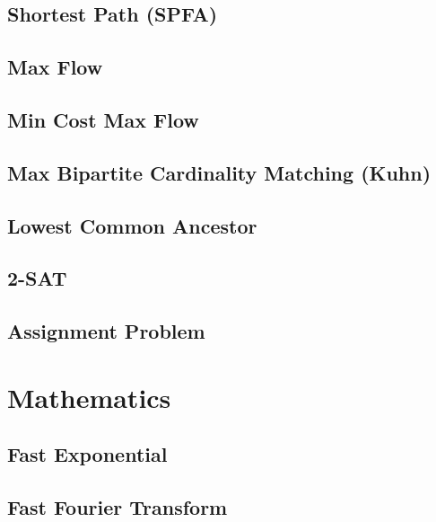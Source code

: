 \subsection{Shortest Path (SPFA)}
\raggedbottom
\hrulefill
\subsection{Max Flow}
\raggedbottom
\hrulefill
\subsection{Min Cost Max Flow}
\raggedbottom
\hrulefill
\subsection{Max Bipartite Cardinality Matching (Kuhn)}
\raggedbottom
\hrulefill
\subsection{Lowest Common Ancestor}
\raggedbottom
\hrulefill
\subsection{2-SAT}
\raggedbottom
\hrulefill
\subsection{Assignment Problem}
\raggedbottom
\hrulefill

\section{Mathematics}
\subsection{Fast Exponential}
\raggedbottom
\hrulefill
\subsection{Fast Fourier Transform}
\raggedbottom
\hrulefill
